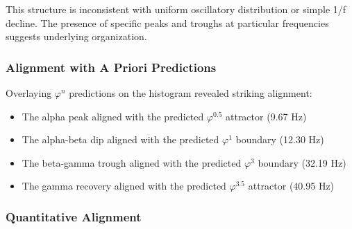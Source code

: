 \documentclass[11pt,a4paper]{article}
\newcommand{\phisym}{\varphi}
\begin{document}
This structure is inconsistent with uniform oscillatory distribution or simple 1/f decline. The presence of specific peaks and troughs at particular frequencies suggests underlying organization.

\subsubsection{Alignment with A Priori Predictions}
Overlaying $\phisym^n$ predictions on the histogram revealed striking alignment:

\begin{itemize}
    \item The alpha peak aligned with the predicted $\phisym^{0.5}$ attractor (9.67 Hz)
    \item The alpha-beta dip aligned with the predicted $\phisym^1$ boundary (12.30 Hz)
    \item The beta-gamma trough aligned with the predicted $\phisym^3$ boundary (32.19 Hz)
    \item The gamma recovery aligned with the predicted $\phisym^{3.5}$ attractor (40.95 Hz)
\end{itemize}

\subsubsection{Quantitative Alignment}
\end{document}
